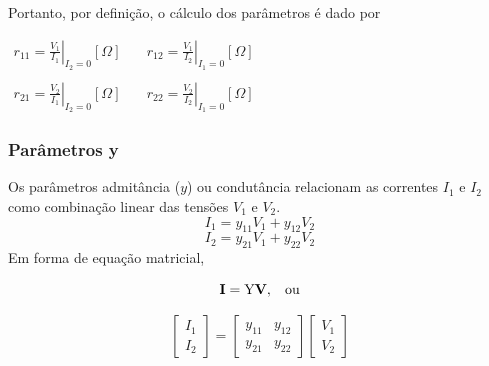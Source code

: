 \documentclass{article}
\numberwithin{equation}{section}
\begin{document}
    Portanto, por definição, o cálculo dos parâmetros é dado por
    \begin{center}
        $\begin{matrix} %
                r_{11}=\displaystyle\left.\frac{V_{1}}{I_{1}}\right|_{I_{2}=0} [\Omega] & \quad r_{12}=\displaystyle\left.\frac{V_{1}}{I_{2}}\right|_{I_{1}=0} [\Omega]\\ \\
                r_{21}=\displaystyle\left.\frac{V_{2}}{I_{1}}\right|_{I_{2}=0} [\Omega] & \quad  r_{22}=\displaystyle\left.\frac{V_{2}}{I_{2}}\right|_{I_{1}=0} [\Omega]
        \end{matrix}$
    \end{center}
    \subsubsection{Parâmetros y}
    \label{subsubsec:quadripolosy}
    Os parâmetros admitância ($y$) ou condutância relacionam as correntes $I_{1}$ e $I_{2}$ como combinação linear das tensões $V_{1}$ e $V_{2}$.
    \begin{equation*}
        I_{1}=y_{11}V_{1}+y_{12}V_{2}
    \end{equation*}
    \begin{equation*}
        I_{2}=y_{21}V_{1}+y_{22}V_{2}
    \end{equation*}
    Em forma de equação matricial,

    \begin{equation*}
        \textbf{I}=\text{Y}\textbf{V}, \hspace{0.3cm} \text{ou}
    \end{equation*}

    \begin{equation}
        \begin{bmatrix}
            I_{1} \\
            I_{2}
        \end{bmatrix}
        = %
        \begin{bmatrix}
            y_{11} & y_{12} \\
            y_{21} & y_{22}
        \end{bmatrix}
        \begin{bmatrix}
            V_{1} \\
            V_{2}
        \end{bmatrix}
    \end{equation}
\end{document}
